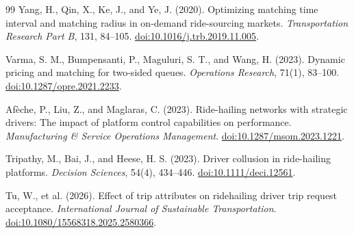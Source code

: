 \documentclass[11pt]{article}
\theoremstyle{definition}
\theoremstyle{remark}
\begin{document}
\begin{thebibliography}{99}
Yang, H., Qin, X., Ke, J., and Ye, J. (2020).
Optimizing matching time interval and matching radius in on-demand
ride-sourcing markets.
\emph{Transportation Research Part B}, 131, 84--105.
\href{https://doi.org/10.1016/j.trb.2019.11.005}{doi:10.1016/j.trb.2019.11.005}.

Varma, S. M., Bumpensanti, P., Maguluri, S. T., and Wang, H. (2023).
Dynamic pricing and matching for two-sided queues.
\emph{Operations Research}, 71(1), 83--100.
\href{https://doi.org/10.1287/opre.2021.2233}{doi:10.1287/opre.2021.2233}.

Af\`eche, P., Liu, Z., and Maglaras, C. (2023).
Ride-hailing networks with strategic drivers: The impact of platform control
capabilities on performance.
\emph{Manufacturing \& Service Operations Management}.
\href{https://doi.org/10.1287/msom.2023.1221}{doi:10.1287/msom.2023.1221}.

Tripathy, M., Bai, J., and Heese, H. S. (2023).
Driver collusion in ride-hailing platforms.
\emph{Decision Sciences}, 54(4), 434--446.
\href{https://doi.org/10.1111/deci.12561}{doi:10.1111/deci.12561}.

Tu, W., et al. (2026).
Effect of trip attributes on ridehailing driver trip request acceptance.
\emph{International Journal of Sustainable Transportation}.
\href{https://doi.org/10.1080/15568318.2025.2580366}{doi:10.1080/15568318.2025.2580366}.

\end{thebibliography}
\end{document}
